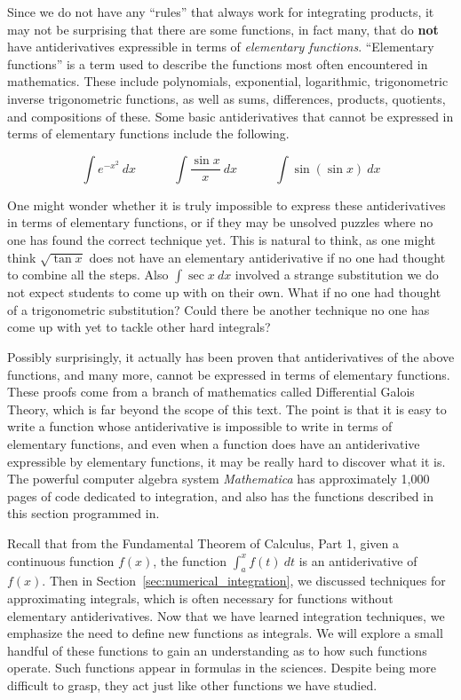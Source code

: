 Since we do not have any ``rules'' that always work for integrating products, it may not be surprising that there are some functions, in fact many, that do \textbf{not} have antiderivatives expressible in terms of \textit{elementary functions}.  ``Elementary functions'' is a term used to describe the functions most often encountered in mathematics.  These include polynomials, exponential, logarithmic, trigonometric inverse trigonometric functions, as well as sums, differences, products, quotients, and compositions of these.  Some basic antiderivatives that cannot be expressed in terms of elementary functions include the following.

$$\int e^{-x^2}\ dx \quad\quad\quad \int \frac{\sin x}{x}\ dx\quad\quad\quad \int \sin(\sin x)\ dx$$

One might wonder whether it is truly impossible to express these antiderivatives in terms of elementary functions, or if they may be unsolved puzzles where no one has found the correct technique yet.  This is natural to think, as one might think $\sqrt{\tan x}$ does not have an elementary antiderivative if no one had thought to combine all the steps.  Also $\int \sec x\ dx$ involved a strange substitution we do not expect students to come up with on their own.  What if no one had thought of a trigonometric substitution?  Could there be another technique no one has come up with yet to tackle other hard integrals?

Possibly surprisingly, it actually has been proven that antiderivatives of the above functions, and many more, cannot be expressed in terms of elementary functions.  These proofs come from a branch of mathematics called Differential Galois Theory, which is far beyond the scope of this text.  The point is that it is easy to write a function whose antiderivative is impossible to write in terms of elementary functions, and even when a function does have an antiderivative expressible by elementary functions, it may be really hard to discover what it is. The powerful computer algebra system \textit{Mathematica}\textsuperscript{\textregistered} has approximately 1,000 pages of code dedicated to integration, and also has the functions described in this section programmed in. 

Recall that from the Fundamental Theorem of Calculus, Part 1, given a continuous function $f(x)$, the function $\int_a^x f(t)\ dt$ is an antiderivative of $f(x)$.  Then in Section~\ref{sec:numerical_integration}, we discussed techniques for approximating integrals, which is often necessary for functions without elementary antiderivatives.  Now that we have learned integration techniques, we emphasize the need to define new functions as integrals.  We will explore a small handful of these functions to gain an understanding as to how such functions operate.  Such functions appear in formulas in the sciences.  Despite being more difficult to grasp, they act just like other functions we have studied.

